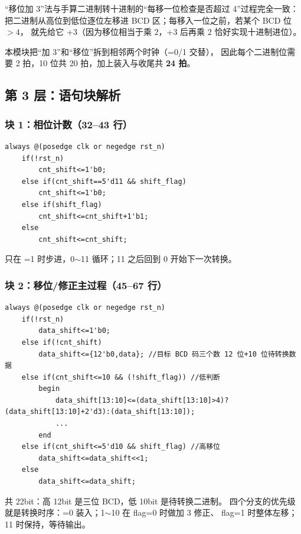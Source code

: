 “移位加 3”法与手算二进制转十进制的“每移一位检查是否超过 4”过程完全一致：
把二进制从高位到低位逐位左移进 BCD 区；每移入一位之前，若某个 BCD 位 $>4$，
就先给它 $+3$（因为移位相当于乘 2，+3 后再乘 2 恰好实现十进制进位）。

本模块把“加 3”和“移位”拆到相邻两个时钟（=0/1 交替），
因此每个二进制位需要 2 拍，10 位共 20 拍，加上装入与收尾共 \textbf{24 拍}。

\subsection{第 3 层：语句块解析}

\subsubsection{块 1：相位计数（32--43 行）}

\begin{lstlisting}[style=vsnip]
always @(posedge clk or negedge rst_n)
    if(!rst_n)
        cnt_shift<=1'b0;
    else if(cnt_shift==5'd11 && shift_flag)
        cnt_shift<=1'b0;
    else if(shift_flag)
        cnt_shift<=cnt_shift+1'b1;
    else
        cnt_shift<=cnt_shift;
\end{lstlisting}

 只在 =1 时步进，0$\sim$11 循环；11 之后回到 0 开始下一次转换。

\subsubsection{块 2：移位/修正主过程（45--67 行）}

\begin{lstlisting}[style=vsnip]
always @(posedge clk or negedge rst_n)
    if(!rst_n)
        data_shift<=1'b0;
    else if(!cnt_shift)
        data_shift<={12'b0,data}; //目标 BCD 码三个数 12 位+10 位待转换数据
    else if(cnt_shift<=10 && (!shift_flag)) //低判断
        begin
            data_shift[13:10]<=(data_shift[13:10]>4)? (data_shift[13:10]+2'd3):(data_shift[13:10]);
            ...
        end
    else if(cnt_shift<=5'd10 && shift_flag) //高移位
        data_shift<=data_shift<<1;
    else
        data_shift<=data_shift;
\end{lstlisting}

 共 22bit：高 12bit 是三位 BCD，低 10bit 是待转换二进制。
四个分支的优先级就是转换时序：=0 装入；1$\sim$10 在 flag=0 时做加 3 修正、
flag=1 时整体左移；11 时保持，等待输出。

